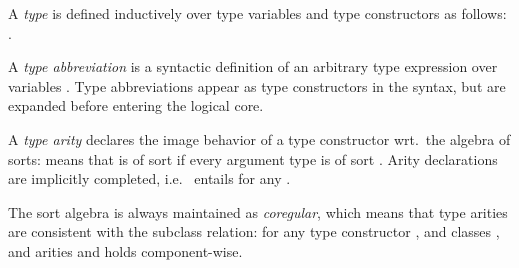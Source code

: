 \begin{isabellebody}
\begin{isamarkuptext}
  A \emph{type} is defined inductively over type variables and type
  constructors as follows: .

  A \emph{type abbreviation} is a syntactic definition \isa{{\isacharparenleft}\isactrlvec {\isasymalpha}{\isacharparenright}{\isasymkappa}\ {\isacharequal}\ {\isasymtau}} of an arbitrary type expression \isa{{\isasymtau}} over
  variables \isa{\isactrlvec {\isasymalpha}}.  Type abbreviations appear as type
  constructors in the syntax, but are expanded before entering the
  logical core.

  A \emph{type arity} declares the image behavior of a type
  constructor wrt.\ the algebra of sorts:  means that  is
  of sort  if every argument type  is
  of sort .  Arity declarations are implicitly
  completed, i.e.\  entails  for any .

  \medskip The sort algebra is always maintained as \emph{coregular},
  which means that type arities are consistent with the subclass
  relation: for any type constructor \isa{{\isasymkappa}}, and classes , and arities  and  holds  component-wise.


\end{isamarkuptext}
\end{isabellebody}
